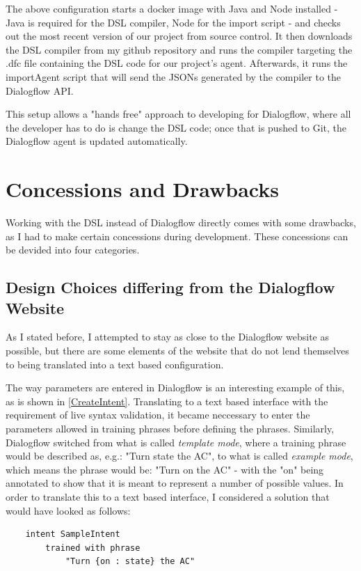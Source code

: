 The above configuration starts a docker image with Java and Node installed - Java is required for the DSL compiler, Node for the import script - and checks out the most recent version of our project from source control.
It then downloads the DSL compiler from my github repository and runs the compiler targeting the .dfc file containing the DSL code for our project's agent.
Afterwards, it runs the importAgent script that will send the JSONs generated by the compiler to the Dialogflow API.

This setup allows a "hands free" approach to developing for Dialogflow, where all the developer has to do is change the DSL code; once that is pushed to Git, the Dialogflow agent is updated automatically.


\section{Concessions and Drawbacks}

Working with the DSL instead of Dialogflow directly comes with some drawbacks, as I had to make certain concessions during development. 
These concessions can be devided into four categories.

\subsection{Design Choices differing from the Dialogflow Website}
As I stated before, I attempted to stay as close to the Dialogflow website as possible, but there are some elements of the website that do not lend themselves to being translated into a text based configuration.

The way parameters are entered in Dialogflow is an interesting example of this, as is shown in \autoref{CreateIntent}. Translating to a text based interface with the requirement of live syntax validation, it became neccessary to enter the parameters allowed in training phrases before defining the phrases.
Similarly, Dialogflow switched from what is called \textit{template mode}, where a training phrase would be described as, e.g.: "Turn state the AC", to what is called \textit{example mode}, which means the phrase would be: "Turn on the AC" - with the "on" being annotated to show that it is meant to represent a number of possible values.
In order to translate this to a text based interface, I considered a solution that would have looked as follows:

\begin{lstlisting}
    intent SampleIntent
        trained with phrase
            "Turn {on : state} the AC"
\end{lstlisting}

